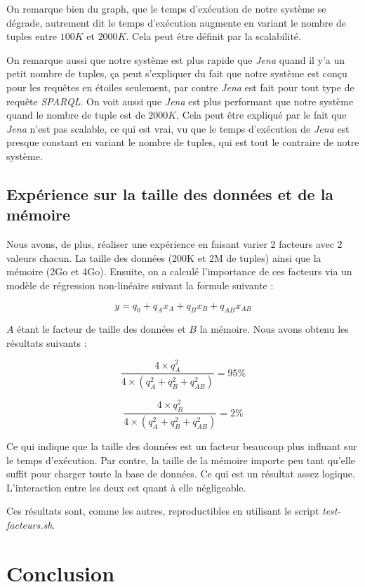 \documentclass[12pt,titlepage]{article}
\begin{document}
On remarque bien du graph, que le temps d'exécution de notre système se dégrade, autrement dit le temps d'exécution augmente en variant le nombre de tuples entre $100K$ et $2000K$. Cela peut être définit par la scalabilité. 

On remarque aussi que notre système est plus rapide que \textit{Jena} quand il y'a un petit nombre de tuples, ça peut s'expliquer du fait que notre système est conçu pour les requêtes en étoiles seulement, par contre \textit{Jena} est fait pour tout type de requête \textit{SPARQL}. On voit aussi que \textit{Jena} est plus performant que notre système quand le nombre de tuple est de $2000K$, Cela peut être expliqué par le fait que \textit{Jena} n'est pas scalable, ce qui est vrai, vu que le temps d'exécution de \textit{Jena} est presque constant en variant le nombre de tuples, qui est tout le contraire de notre système.

\subsection{Expérience sur la taille des données et de la mémoire}

Nous avons, de plus, réaliser une expérience en faisant varier 2 facteurs avec 2 valeurs chacun. La taille des données (200K et 2M de tuples) ainsi que la mémoire (2Go et 4Go). Ensuite, on a calculé l'importance de ces facteurs via un modèle de régression non-linéaire suivant la formule suivante :

\[
  y = q_0 + q_A x_A + q_B x_B + q_{AB} x_{AB}
\]

$A$ étant le facteur de taille des données et $B$ la mémoire. Nous avons obtenu les résultats suivants : 

\[
  \frac{4\times q_A^2}{4 \times  (q_A^2 + q_B^2 + q_{AB}^2)} = 95\%
\]

\[
  \frac{4\times q_B^2}{4 \times  (q_A^2 + q_B^2 + q_{AB}^2)} = 2\%
\]

Ce qui indique que la taille des données est un facteur beaucoup plus influant sur le temps d'exécution. Par contre, la taille de la mémoire importe peu tant qu'elle suffit pour charger toute la base de données. Ce qui est un résultat assez logique. L'interaction entre les deux est quant à elle négligeable.

Ces résultats sont, comme les autres, reproductibles en utilisant le script \textit{test-facteurs.sh}.

\section{Conclusion}
\end{document}
